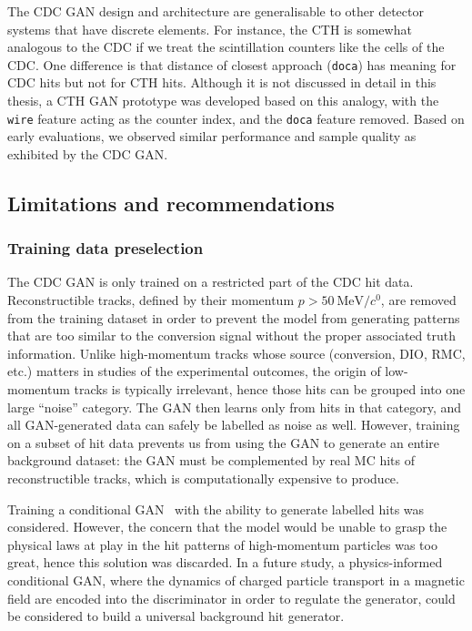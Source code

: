 The CDC GAN design and architecture are generalisable to other detector systems
that have discrete elements. For instance, the CTH is somewhat analogous to the
CDC if we treat the scintillation counters like the cells of the CDC. One
difference is that distance of closest approach (\texttt{doca}) has meaning for
CDC hits but not for CTH hits. Although it is not discussed in detail in this
thesis, a CTH GAN prototype was developed based on this analogy, with the
\texttt{wire} feature acting as the counter index, and the
\texttt{doca} feature removed. Based on early evaluations, we observed similar
performance and sample quality as exhibited by the CDC GAN.




\subsection{Limitations and recommendations}
\subsubsection{Training data preselection}
The CDC GAN is only trained on a restricted part of the CDC hit data.
Reconstructible tracks, defined by their momentum $p>\SI{50}{\MeV/\clight}$, are
removed from the training dataset in order to prevent the model from generating
patterns that are too similar to the conversion signal without the proper
associated truth information. Unlike high-momentum tracks whose source
(conversion, DIO, RMC, etc.) matters in studies of the experimental outcomes,
the origin of low-momentum tracks is typically irrelevant, hence those hits can
be grouped into one large ``noise'' category. The GAN then learns only from hits
in that category, and all GAN-generated data can safely be labelled as noise as
well. However, training on a subset of hit data prevents us from using the GAN
to generate an entire background dataset: the GAN must be complemented by real
MC hits of reconstructible tracks, which is computationally expensive to
produce. 

Training a conditional GAN~\cite{Mirza2014ConditionalGA} with the ability to
generate labelled hits was considered. However, the concern that the model would
be unable to grasp the physical laws at play in the hit patterns of
high-momentum particles was too great, hence this solution was discarded. In a
future study, a physics-informed conditional GAN, where the dynamics of charged
particle transport in a magnetic field are encoded into the discriminator in
order to regulate the generator, could be considered to build a universal
background hit generator.

